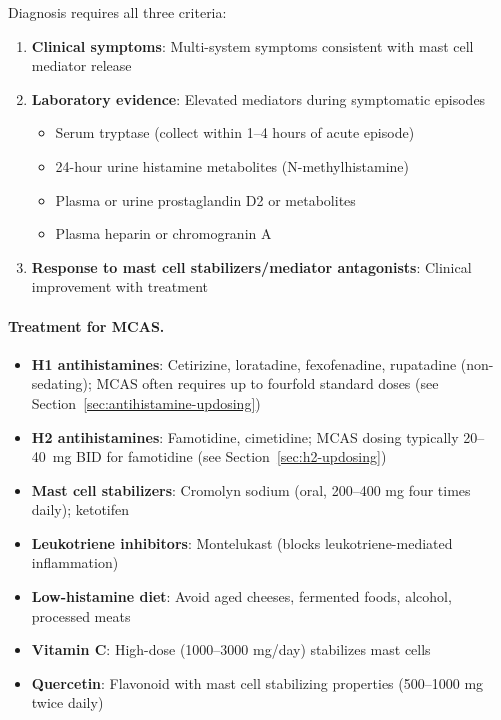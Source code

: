 \begin{observation}
Diagnosis requires all three criteria:
\begin{enumerate}
    \item \textbf{Clinical symptoms}: Multi-system symptoms consistent with mast cell mediator release
    \item \textbf{Laboratory evidence}: Elevated mediators during symptomatic episodes
    \begin{itemize}
        \item Serum tryptase (collect within 1--4 hours of acute episode)
        \item 24-hour urine histamine metabolites (N-methylhistamine)
        \item Plasma or urine prostaglandin D2 or metabolites
        \item Plasma heparin or chromogranin A
    \end{itemize}
    \item \textbf{Response to mast cell stabilizers/mediator antagonists}: Clinical improvement with treatment
\end{enumerate}

\paragraph{Treatment for MCAS.}
\begin{itemize}
    \item \textbf{H1 antihistamines}: Cetirizine, loratadine, fexofenadine, rupatadine (non-sedating); MCAS often requires up to fourfold standard doses (see Section~\ref{sec:antihistamine-updosing})
    \item \textbf{H2 antihistamines}: Famotidine, cimetidine; MCAS dosing typically 20--40~mg BID for famotidine (see Section~\ref{sec:h2-updosing})
    \item \textbf{Mast cell stabilizers}: Cromolyn sodium (oral, 200--400 mg four times daily); ketotifen
    \item \textbf{Leukotriene inhibitors}: Montelukast (blocks leukotriene-mediated inflammation)
    \item \textbf{Low-histamine diet}: Avoid aged cheeses, fermented foods, alcohol, processed meats
    \item \textbf{Vitamin C}: High-dose (1000--3000 mg/day) stabilizes mast cells
    \item \textbf{Quercetin}: Flavonoid with mast cell stabilizing properties (500--1000 mg twice daily)
\end{itemize}


\end{observation}
